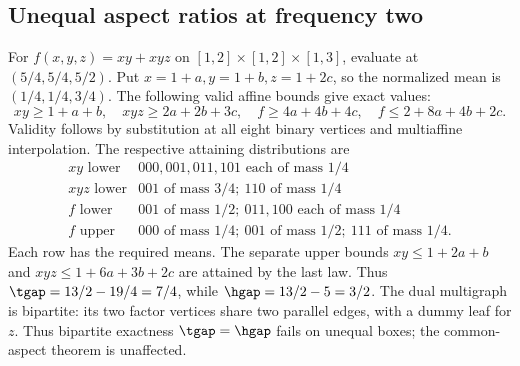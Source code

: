\subsection{Unequal aspect ratios at frequency two}
\begin{example}\label{ex:unequal-seven-six}
For $f(x,y,z)=xy+xyz$ on $[1,2]\times[1,2]\times[1,3]$, evaluate at
$(5/4,5/4,5/2)$. Put $x=1+a,y=1+b,z=1+2c$, so the normalized mean is
$(1/4,1/4,3/4)$. The following valid affine bounds give exact values:
\[
 xy\ge1+a+b,\quad xyz\ge2a+2b+3c,\quad
 f\ge4a+4b+4c,\quad f\le2+8a+4b+2c.
\]
Validity follows by substitution at all eight binary vertices and
multiaffine interpolation. The respective attaining distributions are
\[
\begin{array}{c|l}
 xy\text{ lower}&000,001,011,101\text{ each of mass }1/4\\
 xyz\text{ lower}&001\text{ of mass }3/4;\ 110\text{ of mass }1/4\\
 f\text{ lower}&001\text{ of mass }1/2;\ 011,100\text{ each of mass }1/4\\
 f\text{ upper}&000\text{ of mass }1/4;\ 001\text{ of mass }1/2;
                         \ 111\text{ of mass }1/4.
\end{array}
\]
Each row has the required means. The separate upper bounds
$xy\le1+2a+b$ and $xyz\le1+6a+3b+2c$ are attained by the last law.
Thus $\tgap=13/2-19/4=7/4$, while $\hgap=13/2-5=3/2$.
The dual multigraph is bipartite: its two factor vertices share two
parallel edges, with a dummy leaf for $z$. Thus bipartite exactness
$\tgap=\hgap$ fails on unequal boxes; the common-aspect theorem is
unaffected.
\end{example}


